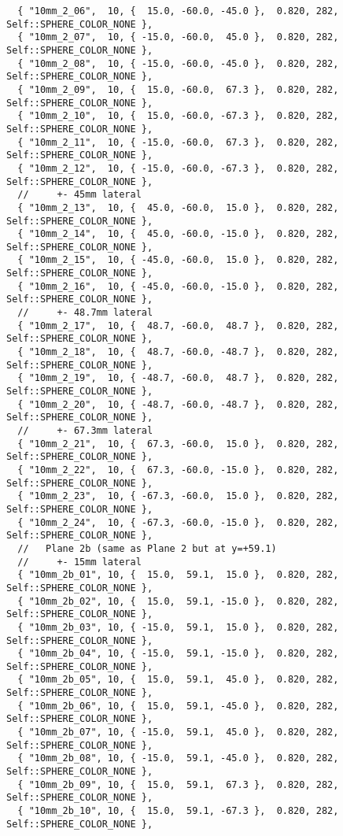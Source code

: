\documentclass{InsightArticle}
\begin{document}
{\begin{verbatim}
  { "10mm_2_06",  10, {  15.0, -60.0, -45.0 },  0.820, 282, Self::SPHERE_COLOR_NONE },
  { "10mm_2_07",  10, { -15.0, -60.0,  45.0 },  0.820, 282, Self::SPHERE_COLOR_NONE },
  { "10mm_2_08",  10, { -15.0, -60.0, -45.0 },  0.820, 282, Self::SPHERE_COLOR_NONE },
  { "10mm_2_09",  10, {  15.0, -60.0,  67.3 },  0.820, 282, Self::SPHERE_COLOR_NONE },
  { "10mm_2_10",  10, {  15.0, -60.0, -67.3 },  0.820, 282, Self::SPHERE_COLOR_NONE },
  { "10mm_2_11",  10, { -15.0, -60.0,  67.3 },  0.820, 282, Self::SPHERE_COLOR_NONE },
  { "10mm_2_12",  10, { -15.0, -60.0, -67.3 },  0.820, 282, Self::SPHERE_COLOR_NONE },
  //     +- 45mm lateral
  { "10mm_2_13",  10, {  45.0, -60.0,  15.0 },  0.820, 282, Self::SPHERE_COLOR_NONE },
  { "10mm_2_14",  10, {  45.0, -60.0, -15.0 },  0.820, 282, Self::SPHERE_COLOR_NONE },
  { "10mm_2_15",  10, { -45.0, -60.0,  15.0 },  0.820, 282, Self::SPHERE_COLOR_NONE },
  { "10mm_2_16",  10, { -45.0, -60.0, -15.0 },  0.820, 282, Self::SPHERE_COLOR_NONE },
  //     +- 48.7mm lateral
  { "10mm_2_17",  10, {  48.7, -60.0,  48.7 },  0.820, 282, Self::SPHERE_COLOR_NONE },
  { "10mm_2_18",  10, {  48.7, -60.0, -48.7 },  0.820, 282, Self::SPHERE_COLOR_NONE },
  { "10mm_2_19",  10, { -48.7, -60.0,  48.7 },  0.820, 282, Self::SPHERE_COLOR_NONE },
  { "10mm_2_20",  10, { -48.7, -60.0, -48.7 },  0.820, 282, Self::SPHERE_COLOR_NONE },
  //     +- 67.3mm lateral
  { "10mm_2_21",  10, {  67.3, -60.0,  15.0 },  0.820, 282, Self::SPHERE_COLOR_NONE },
  { "10mm_2_22",  10, {  67.3, -60.0, -15.0 },  0.820, 282, Self::SPHERE_COLOR_NONE },
  { "10mm_2_23",  10, { -67.3, -60.0,  15.0 },  0.820, 282, Self::SPHERE_COLOR_NONE },
  { "10mm_2_24",  10, { -67.3, -60.0, -15.0 },  0.820, 282, Self::SPHERE_COLOR_NONE },
  //   Plane 2b (same as Plane 2 but at y=+59.1)
  //     +- 15mm lateral
  { "10mm_2b_01", 10, {  15.0,  59.1,  15.0 },  0.820, 282, Self::SPHERE_COLOR_NONE },
  { "10mm_2b_02", 10, {  15.0,  59.1, -15.0 },  0.820, 282, Self::SPHERE_COLOR_NONE },
  { "10mm_2b_03", 10, { -15.0,  59.1,  15.0 },  0.820, 282, Self::SPHERE_COLOR_NONE },
  { "10mm_2b_04", 10, { -15.0,  59.1, -15.0 },  0.820, 282, Self::SPHERE_COLOR_NONE },
  { "10mm_2b_05", 10, {  15.0,  59.1,  45.0 },  0.820, 282, Self::SPHERE_COLOR_NONE },
  { "10mm_2b_06", 10, {  15.0,  59.1, -45.0 },  0.820, 282, Self::SPHERE_COLOR_NONE },
  { "10mm_2b_07", 10, { -15.0,  59.1,  45.0 },  0.820, 282, Self::SPHERE_COLOR_NONE },
  { "10mm_2b_08", 10, { -15.0,  59.1, -45.0 },  0.820, 282, Self::SPHERE_COLOR_NONE },
  { "10mm_2b_09", 10, {  15.0,  59.1,  67.3 },  0.820, 282, Self::SPHERE_COLOR_NONE },
  { "10mm_2b_10", 10, {  15.0,  59.1, -67.3 },  0.820, 282, Self::SPHERE_COLOR_NONE },

\end{verbatim}}
\end{document}
